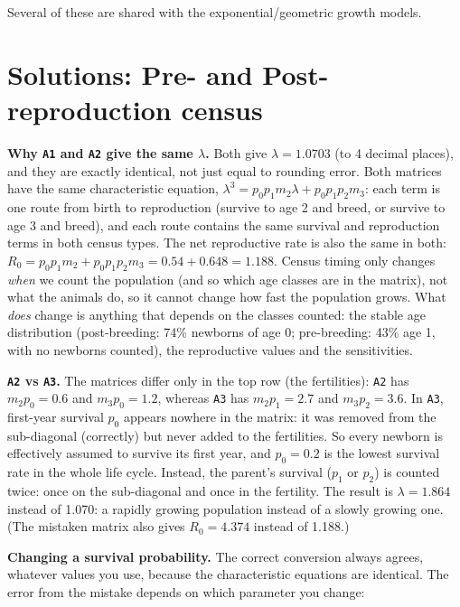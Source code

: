\documentclass[
  a4paper]{book}
\begin{document}
Several of these are shared with the exponential/geometric growth models.

\section{Solutions: Pre- and Post-reproduction census}\label{solutions-pre--and-post-reproduction-census}

\textbf{Why \texttt{A1} and \texttt{A2} give the same \(\lambda\).} Both give \(\lambda = 1.0703\) (to 4 decimal places), and they are exactly identical, not just equal to rounding error. Both matrices have the same characteristic equation, \(\lambda^3 = p_0 p_1 m_2 \lambda + p_0 p_1 p_2 m_3\): each term is one route from birth to reproduction (survive to age 2 and breed, or survive to age 3 and breed), and each route contains the same survival and reproduction terms in both census types. The net reproductive rate is also the same in both: \(R_0 = p_0 p_1 m_2 + p_0 p_1 p_2 m_3 = 0.54 + 0.648 = 1.188\). Census timing only changes \emph{when} we count the population (and so which age classes are in the matrix), not what the animals do, so it cannot change how fast the population grows. What \emph{does} change is anything that depends on the classes counted: the stable age distribution (post-breeding: 74\% newborns of age 0; pre-breeding: 43\% age 1, with no newborns counted), the reproductive values and the sensitivities.

\textbf{\texttt{A2} vs \texttt{A3}.} The matrices differ only in the top row (the fertilities): \texttt{A2} has \(m_2 p_0 = 0.6\) and \(m_3 p_0 = 1.2\), whereas \texttt{A3} has \(m_2 p_1 = 2.7\) and \(m_3 p_2 = 3.6\). In \texttt{A3}, first-year survival \(p_0\) appears nowhere in the matrix: it was removed from the sub-diagonal (correctly) but never added to the fertilities. So every newborn is effectively assumed to survive its first year, and \(p_0 = 0.2\) is the lowest survival rate in the whole life cycle. Instead, the parent's survival (\(p_1\) or \(p_2\)) is counted twice: once on the sub-diagonal and once in the fertility. The result is \(\lambda = 1.864\) instead of 1.070: a rapidly growing population instead of a slowly growing one. (The mistaken matrix also gives \(R_0 = 4.374\) instead of 1.188.)

\textbf{Changing a survival probability.} The correct conversion always agrees, whatever values you use, because the characteristic equations are identical. The error from the mistake depends on which parameter you change:
\end{document}
